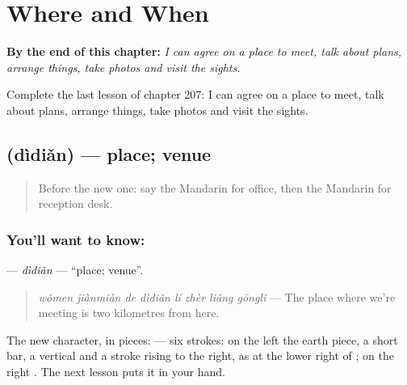 
\chapter{Where and When}
\label{ch:zh-where-and-when}

\begin{chapteropening}
\textbf{By the end of this chapter:} \emph{I can agree on a place to meet, talk about plans, arrange things, take photos and visit the sights.}

Complete the last lesson of chapter 207: I can agree on a place to meet, talk about plans, arrange things, take photos and visit the sights.
\end{chapteropening}

\section[\texorpdfstring{\zh{地点} (dìdiǎn)}{地点 (dìdiǎn)}]{ (dìdiǎn) — place; venue}

\label{lesson:ZH-C207-didian}



\begin{quote}
Before the new one: say the Mandarin for office, then the Mandarin for reception desk.
\end{quote}

\subsection*{You'll want to know: }
\textbf{} — \emph{dìdiǎn} — \textquotedblleft{}place; venue\textquotedblright{}.

\begin{quote}
\textbf{} \emph{wǒmen jiànmiàn de dìdiǎn lí zhèr liǎng gōnglǐ} — The place where we're meeting is two kilometres from here.
\end{quote}

The new character, in pieces:  — six strokes: on the left the earth piece, a short bar, a vertical and a stroke rising to the right, as at the lower right of ; on the right . The next lesson puts it in your hand.

